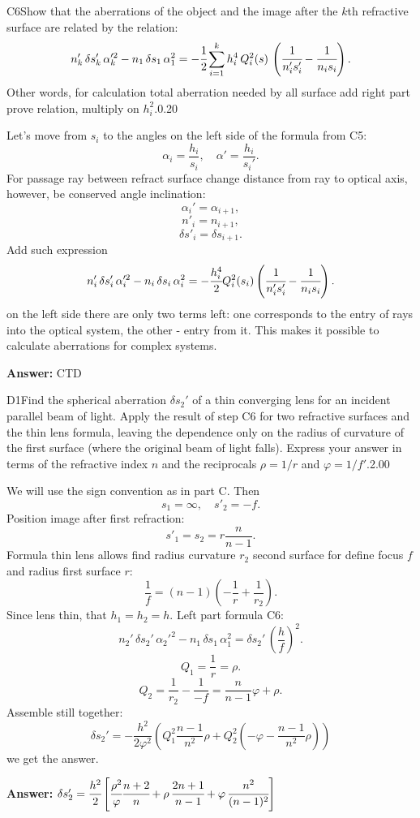 \documentclass[11pt,a4paper]{article}
\begin{document}
\begin{solcard}{C6}{Show that the aberrations of the object and the image after the $k$th refractive surface are related by the relation: $$ n_k'\, \delta s_k' \, \alpha_k'^2 - n_1\, \delta s_1\, \alpha_1^2=-\cfrac{1}{2}\sum_{i=1}^{k} h_i^4\, Q^2_i(s)\, \left(\cfrac{1}{n'_{i}s'_{i}}-\cfrac{1}{n_is_i}\right). $$ Other words, for calculation total aberration needed by all surface add right part prove relation, multiply on $h_i^2$.}{0.20}

Let's move from $s_i$ to the angles on the left side of the formula from C5: $$\alpha_i = \frac{h_i}{s_i}, \quad \alpha '=\frac{h_i}{s_i'}.$$ For passage ray between refract surface change distance from ray to optical axis, however, be conserved angle inclination: $$\alpha_i'=\alpha_{i+1},$$ $$n'_i = n_{i+1},$$ $$\delta s'_i = \delta s_{i+1}.$$ Add such expression $$ n_i'\, \delta s_i' \, \alpha_i'^2 - n_i\, \delta s_i\, \alpha_i^2=-\cfrac{h_i^4}{2} Q_i^2(s_i)\left(\cfrac{1}{n'_is'_i}-\cfrac{1}{n_i s_i}\right). $$ on the left side there are only two terms left: one corresponds to the entry of rays into the optical system, the other - entry from it. This makes it possible to calculate aberrations for complex systems.

\par\smallskip\noindent\textbf{Answer:} CTD
\end{solcard}

\begin{solcard}{D1}{Find the spherical aberration $\delta s_2'$ of a thin converging lens for an incident parallel beam of light. Apply the result of step C6 for two refractive surfaces and the thin lens formula, leaving the dependence only on the radius of curvature of the first surface (where the original beam of light falls). Express your answer in terms of the refractive index $n$ and the reciprocals $\rho=1/r$ and $\varphi=1/f'$.}{2.00}

We will use the sign convention as in part C. Then $$s_1 = \infty, \quad s'_2 = -f.$$ Position image after first refraction: $$s'_1=s_2 = r \frac{n}{n-1}.$$ Formula thin lens allows find radius curvature $r_2$ second surface for define focus $f$ and radius first surface $r$: $$\frac{1}{f} = (n-1)\left( -\frac{1}{r} + \frac{1}{r_2} \right).$$ Since lens thin, that $h_1= h_2=h$. Left part formula C6: $$n_2'\, \delta s_2' \, \alpha_2'^2 - n_1\, \delta s_1\, \alpha_1^2 = \delta s_2' \, \left( \frac{h}{f} \right)^2.$$ $$Q_1=\frac{1}{r} = \rho.$$ $$ Q_2 =  \frac{1}{r_2} - \frac{1}{-f} = \frac{n}{n-1}\varphi + \rho.$$ Assemble still together: $$\delta s_2' = -\frac{h^2}{2 \varphi^2} \left( Q_1^2\frac{n-1}{n^2}\rho + Q_2^2 \left(-\varphi -\frac{n-1}{n^2}\rho \right) \right)$$ we get the answer.

\par\smallskip\noindent\textbf{Answer:} $\delta s_2'=\cfrac{h^2}{2}\left[\cfrac{\rho^2}{\varphi}\cfrac{n+2}{n}+\rho\,\cfrac{2n+1}{n-1}+\varphi\,\cfrac{n^2}{(n-1)^2} \right]$
\end{solcard}
\end{document}
